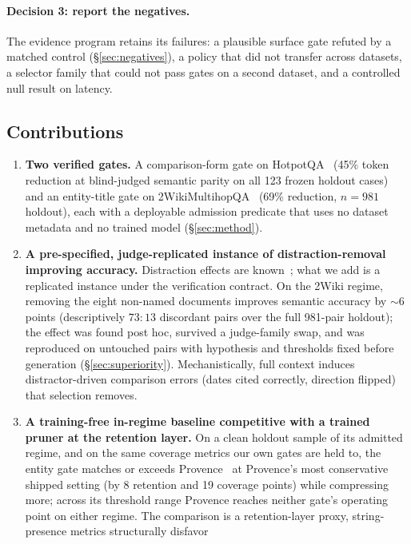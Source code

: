 \documentclass[11pt]{article}
\begin{document}
\paragraph{Decision 3: report the negatives.} The evidence program retains
its failures: a plausible surface gate refuted by a matched control
(\S\ref{sec:negatives}), a policy that did not transfer across datasets, a
selector family that could not pass gates on a second dataset, and a
controlled null result on latency.

\subsection{Contributions}

\begin{enumerate}
\item \textbf{Two verified gates.} A comparison-form gate on
HotpotQA~\citep{yang2018hotpotqa} (45\% token reduction at blind-judged
semantic parity on all 123 frozen holdout cases) and an entity-title gate
on 2WikiMultihopQA~\citep{ho2020constructing} (69\% reduction, $n{=}981$
holdout), each with a deployable admission predicate that uses no dataset
metadata and no trained model (\S\ref{sec:method}).
\item \textbf{A pre-specified, judge-replicated instance of
distraction-removal improving accuracy.} Distraction effects are
known~\citep{shi2023distracted,liu2024lost}; what we add is a replicated
instance under the verification contract. On the 2Wiki regime, removing
the eight non-named documents improves semantic accuracy by ${\sim}6$
points (descriptively $73{:}13$ discordant pairs over the full 981-pair
holdout); the effect was found post hoc, survived a judge-family swap, and
was reproduced on untouched pairs with hypothesis and thresholds fixed
before generation (\S\ref{sec:superiority}). Mechanistically, full context
induces distractor-driven comparison errors (dates cited correctly,
direction flipped) that selection removes.
\item \textbf{A training-free in-regime baseline competitive with a trained
pruner at the retention layer.} On a clean holdout sample of its admitted
regime, and on the same coverage metrics our own gates are held to, the
entity gate matches or exceeds Provence~\citep{chirkova2025provence} at
Provence's most conservative shipped setting (by 8 retention and 19 coverage
points) while compressing more; across its threshold range Provence reaches
neither gate's operating point on either regime. The comparison is a
retention-layer proxy, string-presence metrics structurally disfavor

\end{enumerate}
\end{document}
